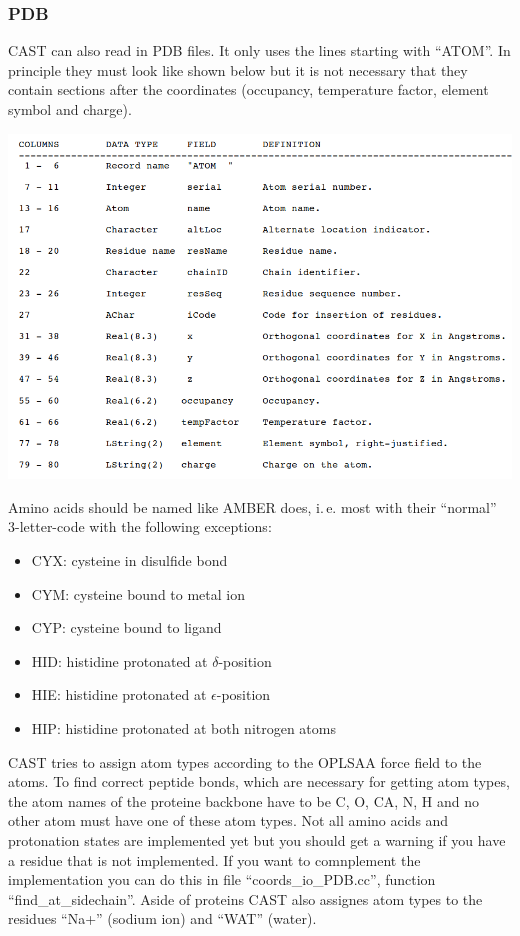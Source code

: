 \documentclass[10pt,a4paper]{article} %
\begin{document}
\subsubsection{PDB}  \label{sec:pdb}

CAST can also read in PDB files. It only uses the lines starting with ``ATOM''. In principle they must look like shown below\supercite{noauthor_protein_nodate} but it is not necessary that they contain sections after the coordinates (occupancy, temperature factor, element symbol and charge). 

\begin{center}
	\includegraphics[width=\textwidth]{img/pdb.png}
\end{center}


Amino acids should be named like AMBER does, i.\,e. most with their ``normal'' 3-letter-code with the following exceptions:
\begin{itemize}
	\item CYX: cysteine in disulfide bond
	\item CYM: cysteine bound to metal ion
	\item CYP: cysteine bound to ligand
	\item HID: histidine protonated at $\delta$-position
	\item HIE: histidine protonated at $\epsilon$-position
	\item HIP: histidine protonated at both nitrogen atoms
\end{itemize}

CAST tries to assign atom types according to the OPLSAA force field to the atoms. To find correct peptide bonds, which are necessary for getting atom types, the atom names of the proteine backbone have to be C, O, CA, N, H and no other atom must have one of these atom types. Not all amino acids and protonation states are implemented yet but you should get a warning if you have a residue that is not implemented. If you want to comnplement the implementation you can do this in file ``coords\_io\_PDB.cc'', function ``find\_at\_sidechain''. Aside of proteins CAST also assignes atom types to the residues ``Na+'' (sodium ion) and ``WAT'' (water).
\end{document}
